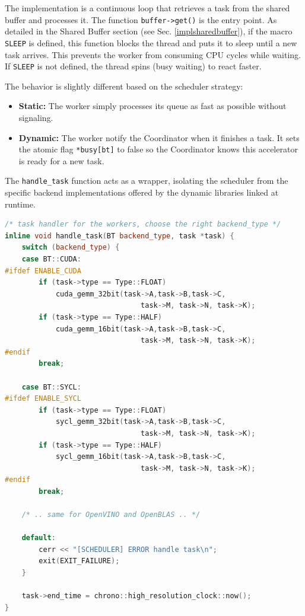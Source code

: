 The implementation is a continuous loop that retrieves a task from the shared buffer and processes it. The function \texttt{buffer->get()} is the entry point. As detailed in the Shared Buffer section (see Sec. \ref{implsharedbuffer}), if the macro \texttt{SLEEP} is defined, this function blocks the thread and puts it to sleep until a new task arrives. This prevents the worker from consuming CPU cycles while waiting. If \texttt{SLEEP} is not defined, the thread spins (busy waiting) to react faster.

The behavior is slightly different based on the scheduler strategy: 

\begin{itemize} 
    \item \textbf{Static:} The worker simply processes its queue as fast as possible without signaling. 

    \item \textbf{Dynamic:} The worker notify the Coordinator when it finishes a task. It sets the atomic flag \texttt{*busy[bt]} to false so the Coordinator knows this accelerator is ready for a new task. 
\end{itemize}

The \texttt{handle\_task} function acts as a wrapper, isolating the scheduler from the specific backend implementations offered by the dynamic libraries linked at runtime.

\begin{lstlisting}[caption={Task Handler}, language=C++, label={sched7}] 
/* task handler for the workers, choose the right backend_type */
inline void handle_task(BT backend_type, task *task) {
    switch (backend_type) {
    case BT::CUDA:
#ifdef ENABLE_CUDA
        if (task->type == Type::FLOAT)
            cuda_gemm_32bit(task->A,task->B,task->C, 
                                task->M, task->N, task->K);
        if (task->type == Type::HALF)
            cuda_gemm_16bit(task->A,task->B,task->C, 
                                task->M, task->N, task->K);
#endif 
        break;    

    case BT::SYCL:
#ifdef ENABLE_SYCL
        if (task->type == Type::FLOAT)
            sycl_gemm_32bit(task->A,task->B,task->C, 
                                task->M, task->N, task->K);
        if (task->type == Type::HALF)
            sycl_gemm_16bit(task->A,task->B,task->C, 
                                task->M, task->N, task->K);
#endif 
        break;    

    /* .. same for OpenVINO and OpenBLAS .. */

    default: 
        cerr << "[SCHEDULER] ERROR handle task\n";
        exit(EXIT_FAILURE);
    }

    task->end_time = chrono::high_resolution_clock::now();
}
\end{lstlisting}

